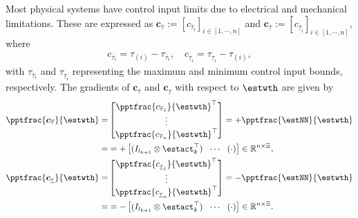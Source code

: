 \documentclass[lettersize,journal]{IEEEtran}
\begin{document}
Most physical systems have control input limits due to electrical and mechanical limitations. These are expressed as $\boldsymbol{c}_{\overline \tau}:= [c_{\overline \tau_i}]_{i\in[1,\cdots,n]}$ and $\boldsymbol{c}_{\underline\tau}:= [c_{\underline\tau_i}]_{i\in[1,\cdots,n]}$, where
\begin{equation}
    \begin{aligned}
        c_{\overline \tau_i}=\tau_{(i)} - {\tau_{\overline \tau_i}}
        ,
        \quad
        c_{\underline\tau_i}={\tau_{\underline\tau_i}}-\tau_{(i)}
        ,
    \end{aligned}
    \label{eq:cstr:input:bound}
\end{equation}
with $\tau_{\overline \tau_i}$ and $\tau_{\underline\tau_i}$ representing the maximum and minimum control input bounds, respectively.
The gradients of $\boldsymbol{c}_{\overline \tau}$ and $\boldsymbol{c}_{\underline\tau}$ with respect to $\estwth$ are given by
\begin{equation}
    \begin{aligned}
        \pptfrac{\boldsymbol c_{\overline \tau}}{\estwth}
        =& 
        \begin{bmatrix}
            \pptfrac{c_{\overline \tau_1}}{\estwth}^\top \\
            \vdots \\
            \pptfrac{c_{\overline \tau_n}}{\estwth}^\top
        \end{bmatrix}
        = 
            +\pptfrac{\estNN}{\estwth}
            \\
        =&
        =
        +
        \begin{bmatrix}
            (I_{l_{k+1}}\otimes \estact_{k}^\top)&
            \!\cdots\! &
            (
                \cdot
            )
        \end{bmatrix} 
        \in
        \mathbb R^{n\times \Xi}
        , 
        \\
        \pptfrac{\boldsymbol c_{\underline\tau}}{\estwth}         
        =
        & 
        \begin{bmatrix}
            \pptfrac{c_{\underline\tau_1}}{\estwth}^\top \\
            \vdots \\
            \pptfrac{c_{\underline\tau_n}}{\estwth}^\top
        \end{bmatrix}
        = 
        -\pptfrac{\estNN}{\estwth}
        \\
        =&
        =
        -\begin{bmatrix}
            (I_{l_{k+1}}\otimes \estact_{k}^\top)&
            \!\cdots\! &
            (
                \cdot
            )
        \end{bmatrix} 
        \in
        \mathbb R^{n\times \Xi}
        .
    \end{aligned}
    \label{eq:cstr:input:bound:grad}
\end{equation}
\end{document}
